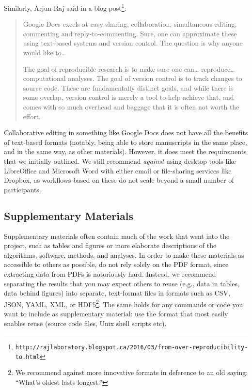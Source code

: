 \documentclass[10pt,letterpaper]{article}
\newcommand{\withurl}[2]{{#1}\footnote{{\texttt{#2}}}}
\begin{document}
Similarly, Arjun Raj said in \withurl{a blog
post}{http://rajlaboratory.blogspot.ca/2016/03/from-over-reproducibility-to.html}:

\begin{quote}

  Google Docs excels at easy sharing, collaboration, simultaneous
  editing, commenting and reply-to-commenting. Sure, one can
  approximate these using text-based systems and version control. The
  question is why anyone would like to{\ldots}

  The goal of reproducible research is to make sure one can{\dots}
  reproduce{\ldots} computational analyses. The goal of version
  control is to track changes to source code. These are fundamentally
  distinct goals, and while there is some overlap, version control is
  merely a tool to help achieve that, and comes with so much overhead
  and baggage that it is often not worth the effort.

\end{quote}

Collaborative editing in something like Google Docs does not have all
the benefits of text-based formats (notably, being able to store
manuscripts in the same place, and in the same way, as other
materials).  However, it does meet the requirements that we initially
outlined.  We still recommend \emph{against} using desktop tools like
LibreOffice and Microsoft Word with either email or
file-sharing services like Dropbox, as workflows based on these do not
scale beyond a small number of participants.

\subsection*{Supplementary Materials}

Supplementary materials often contain much of the work that went into
the project, such as tables and figures or more elaborate descriptions
of the algorithms, software, methods, and analyses. In order to make
these materials as accessible to others as possible, do not rely
solely on the PDF format, since extracting data from PDFs is
notoriously hard.  Instead, we recommend separating the results that
you may expect others to reuse (e.g., data in tables, data behind
figures) into separate, text-format files in formats such as CSV,
JSON, YAML, XML, or HDF5\footnote{We recommend against more innovative
formats in deference to an old saying: ``What's oldest lasts
longest.''}.  The same holds for any commands or code you want to
include as supplementary material: use the format that most easily
enables reuse (source code files, Unix shell scripts etc).
\end{document}
